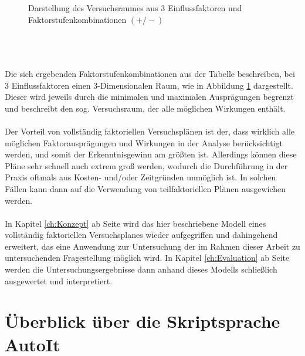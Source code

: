 \documentclass[
fontsize=10pt, 
listof = totoc,
parskip = half	
]{report}
\begin{document}
\begin{minipage}[t]{0.59\linewidth}
\begin{figure}[H]
\begin{tikzpicture}[x=0.75pt,y=0.75pt,yscale=-1,xscale=1, scale=0.6, every node/.style={scale=0.6}]
		\end{tikzpicture}
		\caption{Darstellung des Versuchsraumes aus 3 Einflussfaktoren und Faktorstufenkombinationen $(+/-)$}
		\label{fig:Versuchsplan}
	\end{figure}
\end{minipage}
\\\\\\
\noindent Die sich ergebenden Faktorstufenkombinationen aus der Tabelle beschreiben, bei 3 Einflussfaktoren einen 3-Dimensionalen Raum, wie in Abbildung \ref{fig:Versuchsplan} dargestellt. Dieser wird jeweils durch die minimalen und maximalen Ausprägungen begrenzt und beschreibt den sog. Versuchsraum, der alle möglichen Wirkungen enthält. 
\\\\
\noindent Der Vorteil von vollständig faktoriellen Versuchsplänen ist der, dass wirklich alle möglichen Faktorausprägungen und Wirkungen in der Analyse berücksichtigt werden, und somit der Erkenntnisgewinn am größten ist. Allerdings können diese Pläne sehr schnell auch extrem groß werden, wodurch die Durchführung in der Praxis oftmals aus Kosten- und/oder Zeitgründen unmöglich ist. In solchen  Fällen kann dann auf die Verwendung von teilfaktoriellen Plänen ausgewichen werden.
\\\\
\noindent In Kapitel \ref{ch:Konzept} ab Seite \pageref{ch:Konzept} wird das hier beschriebene Modell eines vollständig faktoriellen Versuchsplanes wieder aufgegriffen und dahingehend erweitert, das eine Anwendung zur Untersuchung der im Rahmen dieser Arbeit zu untersuchenden Fragestellung möglich wird. In Kapitel \ref{ch:Evaluation} ab Seite \pageref{ch:Evaluation} werden die Untersuchungsergebnisse dann anhand dieses Modells schließlich ausgewertet und interpretiert.

\section{Überblick über die Skriptsprache AutoIt}
\label{sec:UeberblickAutoIt}
\end{document}
